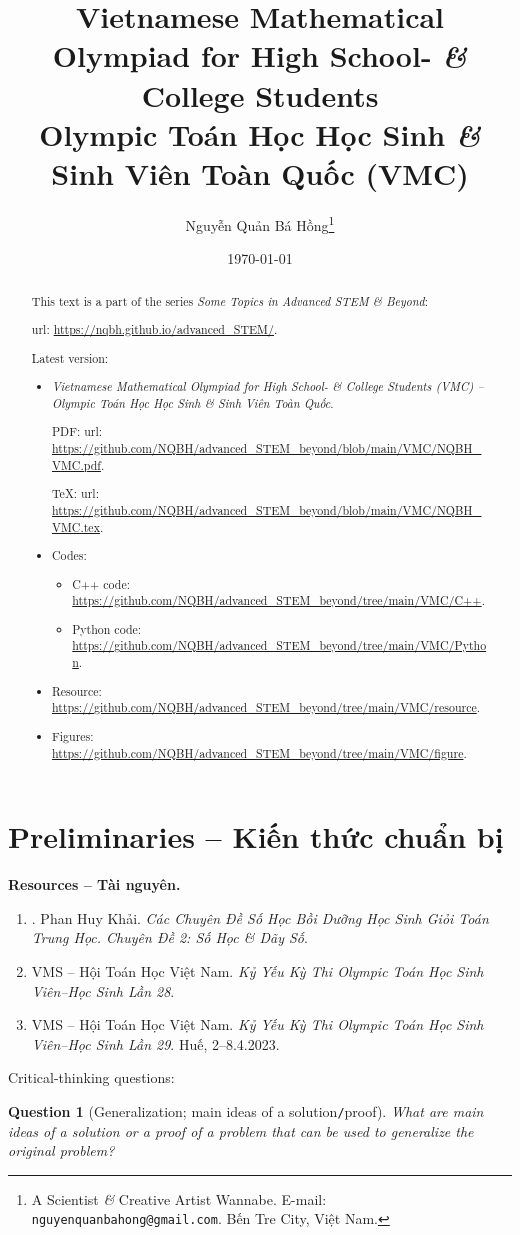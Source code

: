 \documentclass{article}
\title{Vietnamese Mathematical Olympiad for High School- {\it\&} College Students\\Olympic Toán Học Học Sinh {\it\&} Sinh Viên Toàn Quốc (VMC)}
\author{Nguyễn Quản Bá Hồng\footnote{A Scientist {\it\&} Creative Artist Wannabe. E-mail: {\tt nguyenquanbahong@gmail.com}. Bến Tre City, Việt Nam.}}
\date{\today}
\newtheorem{question}{Question}
\begin{document}
\maketitle
\begin{abstract}
	This text is a part of the series {\it Some Topics in Advanced STEM \& Beyond}:
	
	{\sc url}: \url{https://nqbh.github.io/advanced_STEM/}.
	
	Latest version:
	\begin{itemize}
		\item {\it Vietnamese Mathematical Olympiad for High School- \& College Students (VMC) -- Olympic Toán Học Học Sinh \& Sinh Viên Toàn Quốc}.
		
		PDF: {\sc url}: \url{https://github.com/NQBH/advanced_STEM_beyond/blob/main/VMC/NQBH_VMC.pdf}.
		
		\TeX: {\sc url}: \url{https://github.com/NQBH/advanced_STEM_beyond/blob/main/VMC/NQBH_VMC.tex}.
		\item Codes:
		\begin{itemize}
			\item C++ code: \url{https://github.com/NQBH/advanced_STEM_beyond/tree/main/VMC/C++}.
			\item Python code: \url{https://github.com/NQBH/advanced_STEM_beyond/tree/main/VMC/Python}.
		\end{itemize}
		\item Resource: \url{https://github.com/NQBH/advanced_STEM_beyond/tree/main/VMC/resource}.
		\item Figures: \url{https://github.com/NQBH/advanced_STEM_beyond/tree/main/VMC/figure}.
	\end{itemize}
\end{abstract}
\tableofcontents


\section*{Preliminaries -- Kiến thức chuẩn bị}

\textbf{\textsf{Resources -- Tài nguyên.}}
\begin{enumerate}
	\item \cite{Khai_so_hoc_day_so}. {\sc Phan Huy Khải}. {\it Các Chuyên Đề Số Học Bồi Dưỡng Học Sinh Giỏi Toán Trung Học. Chuyên Đề 2: Số Học \& Dãy Số}.
	\item {\sc VMS -- Hội Toán Học Việt Nam}. {\it Kỷ Yếu Kỳ Thi Olympic Toán Học Sinh Viên--Học Sinh Lần 28}.
	\item {\sc VMS -- Hội Toán Học Việt Nam}. {\it Kỷ Yếu Kỳ Thi Olympic Toán Học Sinh Viên--Học Sinh Lần 29}. Huế, 2--8.4.2023.
\end{enumerate}
Critical-thinking questions:
\begin{question}[Generalization; main ideas of a solution{\tt/}proof]
	What are main ideas of a solution or a proof of a problem that can be used to generalize the original problem?
\end{question}
\end{document}

